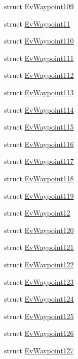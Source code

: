 \begin{DoxyCompactItemize}
struct \hyperlink{structmove__base__z__client_1_1EvWaypoint109}{Ev\+Waypoint109}
\item 
struct \hyperlink{structmove__base__z__client_1_1EvWaypoint11}{Ev\+Waypoint11}
\item 
struct \hyperlink{structmove__base__z__client_1_1EvWaypoint110}{Ev\+Waypoint110}
\item 
struct \hyperlink{structmove__base__z__client_1_1EvWaypoint111}{Ev\+Waypoint111}
\item 
struct \hyperlink{structmove__base__z__client_1_1EvWaypoint112}{Ev\+Waypoint112}
\item 
struct \hyperlink{structmove__base__z__client_1_1EvWaypoint113}{Ev\+Waypoint113}
\item 
struct \hyperlink{structmove__base__z__client_1_1EvWaypoint114}{Ev\+Waypoint114}
\item 
struct \hyperlink{structmove__base__z__client_1_1EvWaypoint115}{Ev\+Waypoint115}
\item 
struct \hyperlink{structmove__base__z__client_1_1EvWaypoint116}{Ev\+Waypoint116}
\item 
struct \hyperlink{structmove__base__z__client_1_1EvWaypoint117}{Ev\+Waypoint117}
\item 
struct \hyperlink{structmove__base__z__client_1_1EvWaypoint118}{Ev\+Waypoint118}
\item 
struct \hyperlink{structmove__base__z__client_1_1EvWaypoint119}{Ev\+Waypoint119}
\item 
struct \hyperlink{structmove__base__z__client_1_1EvWaypoint12}{Ev\+Waypoint12}
\item 
struct \hyperlink{structmove__base__z__client_1_1EvWaypoint120}{Ev\+Waypoint120}
\item 
struct \hyperlink{structmove__base__z__client_1_1EvWaypoint121}{Ev\+Waypoint121}
\item 
struct \hyperlink{structmove__base__z__client_1_1EvWaypoint122}{Ev\+Waypoint122}
\item 
struct \hyperlink{structmove__base__z__client_1_1EvWaypoint123}{Ev\+Waypoint123}
\item 
struct \hyperlink{structmove__base__z__client_1_1EvWaypoint124}{Ev\+Waypoint124}
\item 
struct \hyperlink{structmove__base__z__client_1_1EvWaypoint125}{Ev\+Waypoint125}
\item 
struct \hyperlink{structmove__base__z__client_1_1EvWaypoint126}{Ev\+Waypoint126}
\item 
struct \hyperlink{structmove__base__z__client_1_1EvWaypoint127}{Ev\+Waypoint127}

\end{DoxyCompactItemize}

